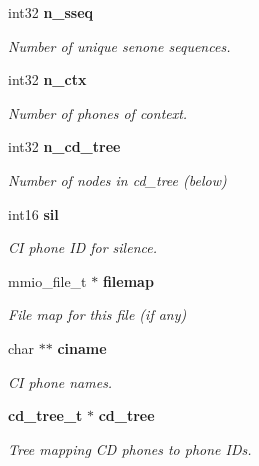 \begin{DoxyCompactItemize}
\mbox{\label{structbin__mdef__s_ab9dad211cbc12eb6f848482bcf78d47f}} 
int32 \textbf{ n\+\_\+sseq}
\begin{DoxyCompactList}\small\item\em Number of unique senone sequences. \end{DoxyCompactList}\item 
\mbox{\label{structbin__mdef__s_a31b5cda5136c6f72816da8889719bfe2}} 
int32 \textbf{ n\+\_\+ctx}
\begin{DoxyCompactList}\small\item\em Number of phones of context. \end{DoxyCompactList}\item 
\mbox{\label{structbin__mdef__s_ad625c3c55d5f42ed275b8b5638a6d80b}} 
int32 \textbf{ n\+\_\+cd\+\_\+tree}
\begin{DoxyCompactList}\small\item\em Number of nodes in cd\+\_\+tree (below) \end{DoxyCompactList}\item 
\mbox{\label{structbin__mdef__s_a9071b7698132c1c2ce92a6f742e1c82f}} 
int16 \textbf{ sil}
\begin{DoxyCompactList}\small\item\em CI phone ID for silence. \end{DoxyCompactList}\item 
\mbox{\label{structbin__mdef__s_a3358a80c50bf3f62417596553adf9c5e}} 
mmio\+\_\+file\+\_\+t $\ast$ \textbf{ filemap}
\begin{DoxyCompactList}\small\item\em File map for this file (if any) \end{DoxyCompactList}\item 
\mbox{\label{structbin__mdef__s_afdd0df913746b0656186fc8c3e8a9206}} 
char $\ast$$\ast$ \textbf{ ciname}
\begin{DoxyCompactList}\small\item\em CI phone names. \end{DoxyCompactList}\item 
\mbox{\label{structbin__mdef__s_a0642be2bb56149689ad3fc1dad1e5d55}} 
\textbf{ cd\+\_\+tree\+\_\+t} $\ast$ \textbf{ cd\+\_\+tree}
\begin{DoxyCompactList}\small\item\em Tree mapping CD phones to phone I\+Ds. \end{DoxyCompactList}\item 
\mbox{\label{structbin__mdef__s_a2c73ae900d198460a30bce4f641d8398}} 
$$
\end{DoxyCompactItemize}
